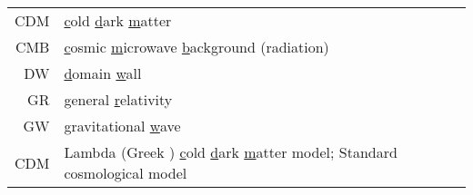 





\begin{tabular*}{\linewidth}{ r l }
    CDM & \underline{c}old \underline{d}ark \underline{m}atter \\
    CMB & \underline{c}osmic \underline{m}icrowave \underline{b}ackground (radiation) \\
    DW& \underline{d}omain \underline{w}all \\
    GR& \underline{g}eneral \underline{r}elativity \\
    GW& \underline{g}ravitational \underline{w}ave\\
    \textLambda{}CDM & Lambda (Greek \underline{\textLambda{}}) \underline{c}old \underline{d}ark \underline{m}atter model; Standard cosmological model \\
\end{tabular*}